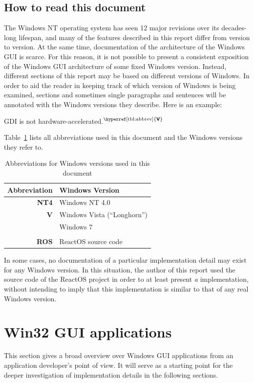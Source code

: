 \documentclass[10pt,twocolumn,a4paper]{article}
\newcommand{\bs}[1]{\textbf{\sffamily #1}}
\newcommand{\winver}[1]{$^{\text{\hyperref[tbl:abbrev]{\bs{#1}}}}$}
\begin{document}
		\subsection{How to read this document}
			The Windows NT operating system has seen 12 major revisions over its
			decades-long lifespan, and many of the features described in this
			report differ from version to version. At the same
			time, documentation of the architecture of the Windows GUI is
			scarce.  For this reason, it is not possible to present a
			consistent exposition of the Windows GUI architecture of
			some fixed Windows version.  Instead, different sections of this
			report may be based on different versions of Windows. In order to
			aid the reader in keeping track of which version of Windows is
			being examined, sections and sometimes
			single paragraphs and sentences will be annotated with the Windows
			versions they describe. Here is an example:

			\vspace{1em}
			GDI is not hardware-accelerated.\winver{V}
			\vspace{1em}

			Table~\ref{tbl:abbrev} lists all abbreviations used in this document
			and the Windows versions they refer to.

			\begin{table}[h]
				\centering
				\begin{tabular}{r|l}
					Abbreviation & Windows Version \\
					\hline
					\bs{NT4} & Windows NT 4.0 \\
					\bs{V} & Windows Vista (\enquote{Longhorn}) \\
					\bs{7} & Windows 7 \\
					\\
					\bs{ROS} & ReactOS source code
				\end{tabular}
				\caption{Abbreviations for Windows versions used in
					this document}
				\label{tbl:abbrev}
			\end{table}

			In some cases, no documentation of a particular implementation detail
			may exist for any Windows version. In this situation, the author of
			this report used the source code of the ReactOS project in order to
			at least present \emph{a} implementation, without intending to imply
			that this implementation is similar to that of any real Windows version.

	\section{Win32 GUI applications}
		This section gives a broad overview over Windows GUI applications from an
		application developer's point of view. It will serve as a starting point
		for the deeper investigation of implementation details in the following
		sections.
\end{document}
